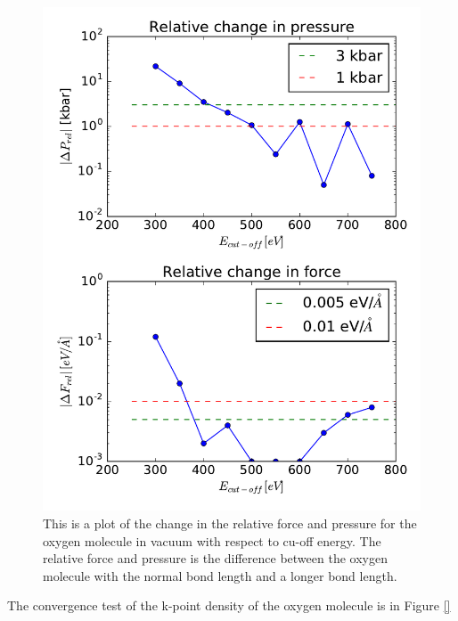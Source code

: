 \begin{figure}[H]
\includegraphics[width=\linewidth]{../fig/oxygen/deltaforcepressrel.pdf}\caption{This is a plot of the change in the relative force and pressure for the oxygen molecule in vacuum with respect to cu-off energy. The relative force and pressure is the difference between the oxygen molecule with the normal bond length and a longer bond length.}\label{fig:forcepresscutoff_O2}
\end{figure}


The convergence test of the k-point density of the oxygen molecule is in Figure \ref{}


